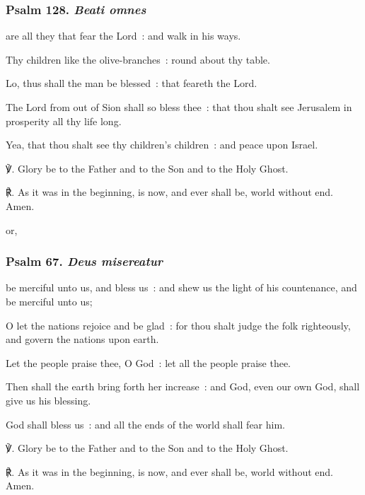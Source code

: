 \subsubsection{Psalm 128. \textit{Beati omnes}}
 are all they that fear the Lord~: and walk in his ways.\par
{}
Thy children like the olive-branches~: round about thy table.\par
{}Lo, thus shall the man be blessed~: that feareth the Lord.\par
{}The Lord from out of Sion shall so bless thee~: that thou shalt see Jerusalem in prosperity all thy life long.\par
{}Yea, that thou shalt see thy children's children~: and peace upon Israel.\par
     ℣. Glory be to the Father and to the Son and to the Holy Ghost.\par
    ℟. As it was in the beginning, is now, and ever shall be, world without end. Amen.
    
\begin{inhead}
    or,
\end{inhead}

\subsubsection{Psalm 67. \textit{Deus misereatur}}
 be merciful unto us, and bless us~: and shew us the light of his countenance, and be merciful unto us;\par
{}
O let the nations rejoice and be glad~: for thou shalt judge the folk righteously, and govern the nations upon earth.\par
{}Let the people praise thee, O God~: let all the people praise thee.\par
{}Then shall the earth bring forth her increase~: and God, even our own God, shall give us his blessing.\par
{}God shall bless us~: and all the ends of the world shall fear him.\par
    ℣. Glory be to the Father and to the Son and to the Holy Ghost.\par
    ℟. As it was in the beginning, is now, and ever shall be, world without end. Amen.


